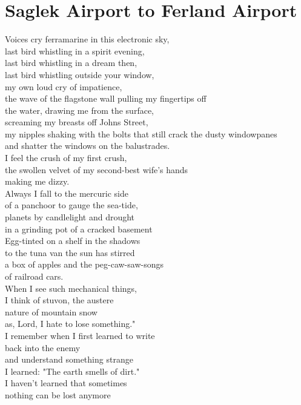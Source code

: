 \documentclass[smalldemyvopaper,11pt,twoside,onecolumn,openright,extrafontsizes]{memoir}
\begin{document}
\chapter{Saglek Airport to Ferland Airport}
Voices cry ferramarine in this electronic sky,
\\last bird whistling in a spirit evening,
\\last bird whistling in a dream then,
\\last bird whistling outside your window,
\\my own loud cry of impatience,
\\the wave of the flagstone wall pulling my fingertips off
\\the water, drawing me from the surface,
\\screaming my breasts off Johns Street,
\\my nipples shaking with the bolts that still crack the dusty windowpanes
\\and shatter the windows on the balustrades.
\\I feel the crush of my first crush,
\\the swollen velvet of my second-best wife's hands
\\making me dizzy.
\\Always I fall to the mercuric side
\\of a panchoor to gauge the sea-tide,
\\planets by candlelight and drought
\\in a grinding pot of a cracked basement
\\Egg-tinted on a shelf in the shadows
\\to the tuna van the sun has stirred
\\a box of apples and the peg-caw-saw-songs
\\of railroad cars.
\\When I see such mechanical things,
\\I think of stuvon, the austere
\\nature of mountain snow
\\as, Lord, I hate to lose something."
\\I remember when I first learned to write
\\back into the enemy
\\and understand something strange
\\I learned: "The earth smells of dirt."
\\I haven't learned that sometimes
\\nothing can be lost anymore
\end{document}
